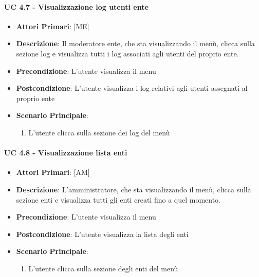 			\paragraph{UC 4.7 - Visualizzazione log utenti ente}
			\begin{itemize}
				\item \textbf{Attori Primari}: [ME]
				\item \textbf{Descrizione}: Il moderatore ente, che sta visualizzando il menù, clicca sulla sezione log e visualizza tutti i log associati agli utenti del proprio ente.
				\item \textbf{Precondizione}: L'utente visualizza il menu
				\item \textbf{Postcondizione}: L'utente visualizza i log relativi agli utenti assegnati al proprio ente
				\item \textbf{Scenario Principale}:
				\begin{enumerate}
					\item{L'utente clicca sulla sezione dei log del menù}
				\end{enumerate}	
			\end{itemize}

			\paragraph{UC 4.8 - Visualizzazione lista enti}
			\begin{itemize}
				\item \textbf{Attori Primari}: [AM]
				\item \textbf{Descrizione}: L'amministratore, che sta visualizzando il menù, clicca sulla sezione enti e visualizza tutti gli enti creati fino a quel momento. 
				\item \textbf{Precondizione}: L'utente visualizza il menu
				\item \textbf{Postcondizione}: L'utente visualizza la lista degli enti
				\item \textbf{Scenario Principale}:
				\begin{enumerate}
					\item{L'utente clicca sulla sezione degli enti del menù}
				\end{enumerate}	
			\end{itemize}

